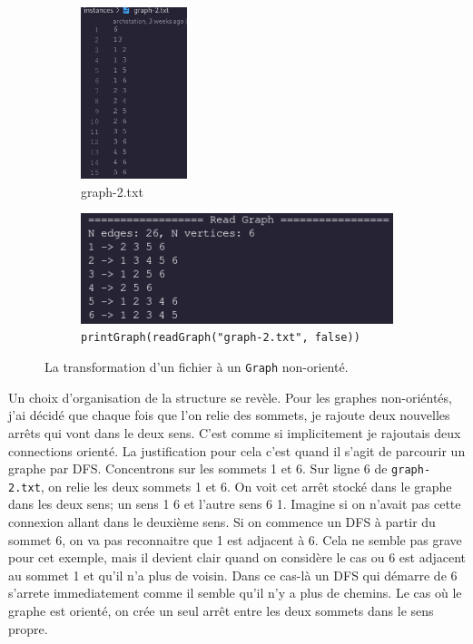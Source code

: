 \documentclass[10pt]{article} %
\begin{document}
\begin{figure}[h!]
    \centering
    \begin{subfigure}{0.45\textwidth}
        \centering
        \includegraphics[height=5cm]{media/graph2_txt.png}
        \caption{graph-2.txt}
    \end{subfigure}
    \hfill
    \begin{subfigure}{0.45\textwidth}
        \centering
        \includegraphics[width=\textwidth]{media/readGraph2.png}
        \caption{\texttt{printGraph(readGraph("graph-2.txt", false))}}
    \end{subfigure}
    \caption{La transformation d'un fichier à un \texttt{Graph} non-orienté.}
    \label{Fig:graph2}

\end{figure}

Un choix d'organisation de la structure se revèle. Pour les graphes non-oriéntés, j'ai décidé que chaque fois que l'on relie
des sommets, je rajoute deux nouvelles arrêts qui vont dans le deux sens. C'est comme si implicitement je rajoutais deux connections orienté.
La justification pour cela c'est quand il s'agit de parcourir un graphe par DFS. Concentrons sur les sommets 1 et 6. Sur ligne 6 de \texttt{graph-2.txt}, on relie
les deux sommets 1 et 6. On voit cet arrêt stocké dans le graphe dans les deux sens; un sens 1  6 et l'autre sens 6  1. Imagine si on n'avait pas cette connexion
allant dans le deuxième sens. Si on commence un DFS à partir du sommet 6, on va pas reconnaitre que 1 est adjacent à 6. Cela ne semble pas grave pour cet exemple,
mais il devient clair quand on considère le cas ou 6 est adjacent au sommet 1 et qu'il n'a plus de voisin. Dans ce cas-là un DFS qui démarre de 6 s'arrete immediatement
comme il semble qu'il n'y a plus de chemins. Le cas où le graphe est orienté, on crée un seul arrêt entre les deux sommets dans le sens propre.
\end{document}

